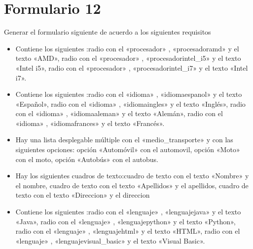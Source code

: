 \documentclass[letterpaper,10pt,spanish]{sphinxmanual}
\begin{document}
\section{Formulario 12}
\label{\detokenize{ejercicios/formularios/anexo_formularios:formulario-12}}
Generar el formulario siguiente de acuerdo a los siguientes requisitos
\begin{itemize}
\item {} 
Contiene los siguientes :radio con el   «procesador» ,   «procesadoramd»  y el texto «AMD», radio con el   «procesador» ,   «procesadorintel\_i5»  y el texto «Intel i5», radio con el   «procesador» ,   «procesadorintel\_i7»  y el texto «Intel i7».

\item {} 
Contiene los siguientes :radio con el   «idioma» ,   «idiomaespanol»  y el texto «Español», radio con el   «idioma» ,   «idiomaingles»  y el texto «Inglés», radio con el   «idioma» ,   «idiomaaleman»  y el texto «Alemán», radio con el   «idioma» ,   «idiomafrances»  y el texto «Francés».

\item {} 
Hay una lista desplegable múltiple con el  «medio\_transporte» y con las siguientes opciones: opción «Automóvil» con el  automovil, opción «Moto» con el  moto, opción «Autobús» con el  autobus.

\item {} 
Hay los siguientes cuadros de texto:cuadro de texto con el texto «Nombre» y el  nombre, cuadro de texto con el texto «Apellidos» y el  apellidos, cuadro de texto con el texto «Direccion» y el  direccion

\item {} 
Contiene los siguientes :radio con el   «lenguaje» ,   «lenguajejava»  y el texto «Java», radio con el   «lenguaje» ,   «lenguajepython»  y el texto «Python», radio con el   «lenguaje» ,   «lenguajehtml»  y el texto «HTML», radio con el   «lenguaje» ,   «lenguajevisual\_basic»  y el texto «Visual Basic».


\end{itemize}
\end{document}

